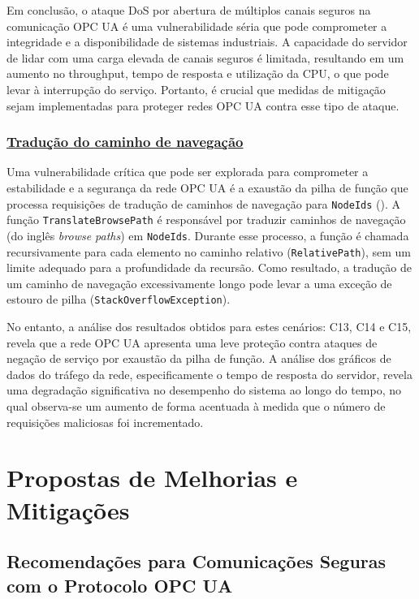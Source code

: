 Em conclusão, o ataque DoS por abertura de múltiplos canais seguros na comunicação OPC UA é uma vulnerabilidade séria que pode comprometer a integridade e a disponibilidade de sistemas industriais. A capacidade do servidor de lidar com uma carga elevada de canais seguros é limitada, resultando em um aumento no throughput, tempo de resposta e utilização da CPU, o que pode levar à interrupção do serviço. Portanto, é crucial que medidas de mitigação sejam implementadas para proteger redes OPC UA contra esse tipo de ataque.

\subsubsection*{\underline{Tradução do caminho de navegação}}

Uma vulnerabilidade crítica que pode ser explorada para comprometer a estabilidade e a segurança da rede OPC UA é a exaustão da pilha de função que processa requisições de tradução de caminhos de navegação para \texttt{NodeIds} (). A função \texttt{TranslateBrowsePath} é responsável por traduzir caminhos de navegação (do inglês \textit{browse paths}) em \texttt{NodeIds}. Durante esse processo, a função é chamada recursivamente para cada elemento no caminho relativo (\texttt{RelativePath}), sem um limite adequado para a profundidade da recursão. Como resultado, a tradução de um caminho de navegação excessivamente longo pode levar a uma exceção de estouro de pilha (\texttt{StackOverflowException}).

No entanto, a análise dos resultados obtidos para estes cenários: C13, C14 e C15, revela que a rede OPC UA apresenta uma leve proteção contra ataques de negação de serviço por exaustão da pilha de função. A análise dos gráficos de dados do tráfego da rede, especificamente o tempo de resposta do servidor, revela uma degradação significativa no desempenho do sistema ao longo do tempo, no qual observa-se um aumento de forma acentuada à medida que o número de requisições maliciosas foi incrementado.


\section{Propostas de Melhorias e Mitigações} \label{sec:melhorias-mitigacoes}

\subsection{Recomendações para Comunicações Seguras com o Protocolo OPC UA}

